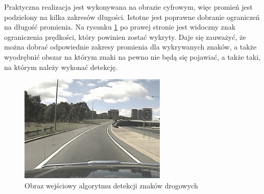 Praktyczna realizacja jest wykonywana na obrazie cyfrowym, więc promień jest podzielony na kilka zakresów długości. Istotne jest poprawne dobranie ograniczeń na długość promienia. Na rysunku \ref{fig:tsd} po prawej stronie jest widoczny znak ograniczenia prędkości, który powinien zostać wykryty. Daje się zauważyć, że można dobrać odpowiednie zakresy promienia dla wykrywanych znaków, a także wyodrębnić obszar na którym znaki na pewno nie będą się pojawiać, a także taki, na którym należy wykonać detekcję.
\begin{figure}
  \centering
  \includegraphics[width=7cm]{img/znaki1.png}
  \caption{Obraz wejściowy algorytmu detekcji znaków drogowych\cite{T2}}
  \label{fig:tsd}
\end{figure}


